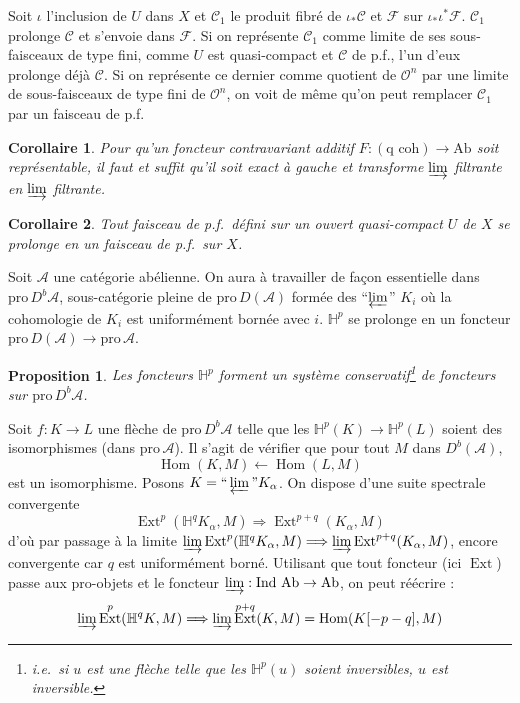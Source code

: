 \documentclass[12pt]{amsart}
\theoremstyle{plain}
\newtheorem{prop}{Proposition}
\newtheorem{cor}{Corollaire}
\theoremstyle{definition}
\DeclareMathOperator{\Hom}{Hom}
\DeclareMathOperator{\Ext}{Ext}
\newcommand{\Ind}{\text{Ind}\,}
\newcommand{\Pro}{\text{pro}\,}
\newcommand{\Ab}{\text{Ab}}
\newcommand{\cF}{\mathcal{F}}
\newcommand{\cO}{\mathcal{O}}
\newcommand{\cC}{\mathcal{C}}
\newcommand{\cA}{\mathcal{A}}
\newcommand{\cDb}{D^{b}}
\newcommand{\cD}{D}
\newcommand{\bH}{\mathbb{H}}
\begin{document}
Soit $\iota$ l'inclusion de $U$ dans $X$ et $\cC_{1}$ le produit fibr\'e de $\iota_{*}\cC$ et $\cF$ sur $\iota_{*}\iota^{*}\cF$. $\cC_{1}$ prolonge $\cC$ et s'envoie dans $\cF$. Si on repr\'esente $\cC_{1}$ comme limite de ses sous-faisceaux de type fini, comme $U$ est quasi-compact et $\cC$ de p.f., l'un d'eux prolonge d\'ej\`a $\cC$. Si on repr\'esente ce dernier comme quotient de $\cO^{n}$ par une limite de sous-faisceaux de type fini de $\cO^{n}$, on voit de m\^eme qu'on peut remplacer $\cC_{1}$ par un faisceau de p.f.

\begin{cor}
Pour qu'un foncteur contravariant additif $F: (\text{q coh}) \to \Ab$ soit repr\'esentable, il faut et suffit qu'il soit exact \`a gauche et transforme $\varinjlim$ filtrante en $\varinjlim$ filtrante.
\end{cor}

\begin{cor}
Tout faisceau de p.f.\ d\'efini sur un ouvert quasi-compact $U$ de $X$ se prolonge en un faisceau de p.f.\ sur $X$.
\end{cor}

\medskip

Soit $\cA$ une cat\'egorie ab\'elienne. On aura \`a travailler de fa\c{c}on essentielle dans $\Pro \cDb\cA$, sous-cat\'egorie pleine de $\Pro \cD(\cA)$ form\'ee des ``$\varprojlim$'' $K_{i}$ o\`u la cohomologie de $K_{i}$ est uniform\'ement born\'ee avec $i$. $\bH^{p}$ se prolonge en un foncteur $\Pro \cD(\cA) \to \Pro \cA$.

\begin{prop}
Les foncteurs $\bH^{p}$ forment un syst\`eme conservatif\footnote{i.e.\ si $u$ est une fl\`eche telle que les $\bH^{p}(u)$ soient inversibles, $u$ est inversible.} de foncteurs sur $\Pro \cDb\cA$.
\end{prop}

Soit $f: K \to L$ une fl\`eche de $\Pro \cDb\cA$ telle que les $\bH^{p}(K) \to \bH^{p}(L)$ soient des isomorphismes (dans $\Pro \cA$). Il s'agit de v\'erifier que pour tout $M$ dans $\cDb(\cA)$,
\[
\Hom(K,M) \longleftarrow \Hom(L,M)
\]
est un isomorphisme. Posons $K = \text{``}\varprojlim\text{''} K_{\alpha}$. On dispose d'une suite spectrale convergente
\[
\Ext^{p}(\bH^{q}K_{\alpha}, M) \Longrightarrow \Ext^{p+q}(K_{\alpha}, M)
\]
d'o\`u par passage \`a la limite $\varinjlim \Ext^{p}(\bH^{q}K_{\alpha}, M) \Longrightarrow \varinjlim \Ext^{p+q}(K_{\alpha}, M)$, encore convergente car $q$ est uniform\'ement born\'e. Utilisant que tout foncteur (ici $\Ext$) passe aux pro-objets et le foncteur $\varinjlim: \Ind\,\Ab \to \Ab$, on peut r\'e\'ecrire :
\[
\varinjlim \Ext^{p}(\bH^{q}K, M) \Longrightarrow \varinjlim \Ext^{p+q}(K,M) = \Hom(K[-p-q],M)
\]
\end{document}
